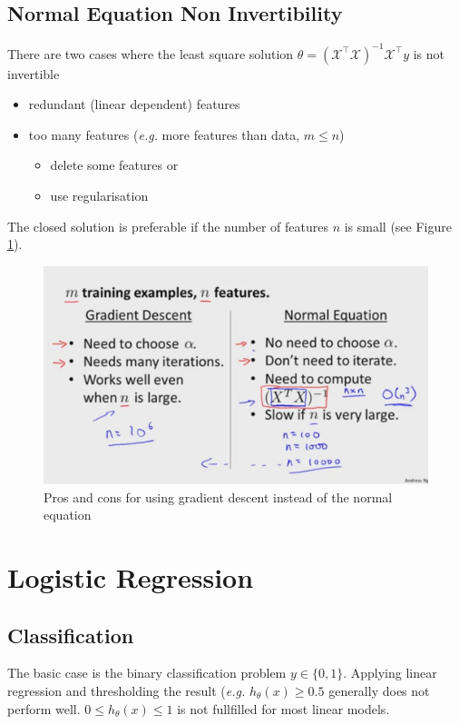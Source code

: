 \documentclass[a4paper,twoside,10pt]{article}
\begin{document}
\subsection{Normal Equation Non Invertibility}
There are two cases where the least square solution $\theta=(\mathcal{X}^\top\mathcal{X})^{-1}\mathcal{X}^\top y$ is not invertible
\begin{itemize}
  \item redundant (linear dependent) features
  \item too many features (\emph{e.g.} more features than data, $m\le n$)
    \begin{itemize}
      \item delete some features or
      \item use regularisation
    \end{itemize}
\end{itemize}
The closed solution is preferable if the number of features $n$ is small (see Figure \ref{fig:gcp}).
\begin{figure}[htbp]
  \begin{center}
    \includegraphics[width=.6\textwidth]{gradientproscons}
    \caption{Pros and cons for using gradient descent instead of the normal equation\citep{andrewng}\label{fig:gcp}}
  \end{center}
\end{figure}

\section{Logistic Regression}
\subsection{Classification}
The basic case is the binary classification problem $y\in\{0,1\}$.
Applying linear regression and thresholding the result (\emph{e.g.} $h_\theta(x)\ge 0.5$ generally does not perform well.
$0\le h_\theta(x)\le 1$ is not fullfilled for most linear models.
\end{document}

